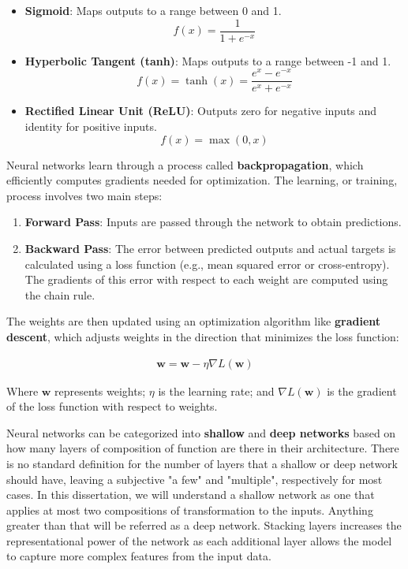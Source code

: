 \begin{itemize}
    \item \textbf{Sigmoid}: Maps outputs to a range between 0 and 1.
    \[
    f(x) = \frac{1}{1 + e^{-x}}
    \]
    
    \item \textbf{Hyperbolic Tangent (tanh)}: Maps outputs to a range between -1 and 1.
    \[
    f(x) = \tanh(x) = \frac{e^x - e^{-x}}{e^x + e^{-x}}
    \]
    
    \item \textbf{Rectified Linear Unit (ReLU)}: Outputs zero for negative inputs and identity for positive inputs.
    \[
    f(x) = \max(0, x)
    \]
\end{itemize}

Neural networks learn through a process called \textbf{backpropagation}, which efficiently computes gradients needed for optimization. The learning, or training, process involves two main steps: 

\begin{enumerate}
    \item \textbf{Forward Pass}: Inputs are passed through the network to obtain predictions.
    \item \textbf{Backward Pass}: The error between predicted outputs and actual targets is calculated using a loss function (e.g., mean squared error or cross-entropy). The gradients of this error with respect to each weight are computed using the chain rule.
\end{enumerate}

The weights are then updated using an optimization algorithm like \textbf{gradient descent}, which adjusts weights in the direction that minimizes the loss function:

\begin{align}
  \mathbf{w} = \mathbf{w} - \eta \nabla L(\mathbf{w})  
\end{align}

Where \(\mathbf{w}\) represents weights; \(\eta\) is the learning rate; and \(\nabla L(\mathbf{w})\) is the gradient of the loss function with respect to weights.

Neural networks can be categorized into \textbf{shallow} and \textbf{deep networks} based on how many layers of composition of function are there in their architecture. There is no standard definition for the number of layers that a shallow or deep network should have, leaving a subjective "a few" and "multiple", respectively for most cases. In this dissertation, we will understand a shallow network as one that applies at most two compositions of transformation to the inputs. Anything greater than that will be referred as a deep network. Stacking layers increases the representational power of the network as each additional layer allows the model to capture more complex features from the input data.


